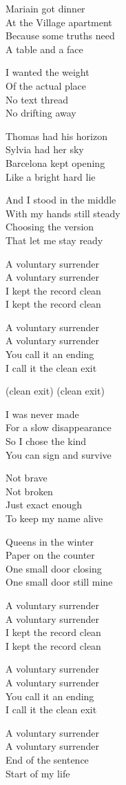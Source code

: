 \begin{lyrics}
Mariain got dinner\\
At the Village apartment\\
Because some truths need\\
A table and a face

I wanted the weight\\
Of the actual place\\
No text thread\\
No drifting away

Thomas had his horizon\\
Sylvia had her sky\\
Barcelona kept opening\\
Like a bright hard lie

And I stood in the middle\\
With my hands still steady\\
Choosing the version\\
That let me stay ready

A voluntary surrender\\
A voluntary surrender\\
I kept the record clean\\
I kept the record clean

A voluntary surrender\\
A voluntary surrender\\
You call it an ending\\
I call it the clean exit

(clean exit)
(clean exit)

I was never made\\
For a slow disappearance\\
So I chose the kind\\
You can sign and survive

Not brave\\
Not broken\\
Just exact enough\\
To keep my name alive

Queens in the winter\\
Paper on the counter\\
One small door closing\\
One small door still mine

A voluntary surrender\\
A voluntary surrender\\
I kept the record clean\\
I kept the record clean

A voluntary surrender\\
A voluntary surrender\\
You call it an ending\\
I call it the clean exit

A voluntary surrender\\
A voluntary surrender\\
End of the sentence\\
Start of my life
\end{lyrics}

